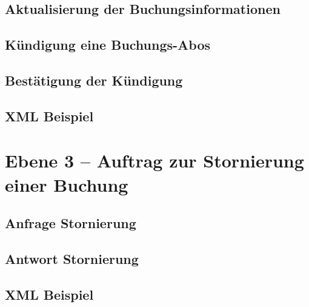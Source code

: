

\subsection{Aktualisierung der Buchungsinformationen}



\subsection{Kündigung eine Buchungs-Abos}



\subsection{Bestätigung der Kündigung}



\subsection{XML Beispiel}

\section{Ebene 3 -- Auftrag zur Stornierung einer Buchung}



\subsection{Anfrage Stornierung}



\subsection{Antwort Stornierung}



\subsection{XML Beispiel}

